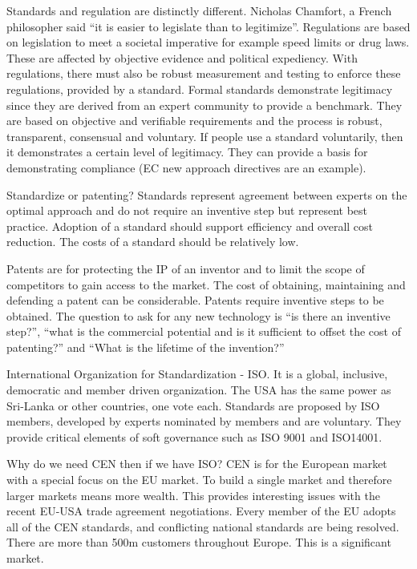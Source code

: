 Standards and regulation are distinctly different. Nicholas Chamfort, a French philosopher said ``it is easier to legislate than to legitimize''. 
Regulations are based on legislation to meet a societal imperative for example speed limits or drug laws. 
These are affected by objective evidence and political expediency. 
With regulations, there must also be robust measurement and testing to enforce these regulations, provided by a standard. 
Formal standards demonstrate legitimacy since they are derived from an expert community to provide a benchmark. 
They are based on objective and verifiable requirements and the process is robust, transparent, consensual and voluntary. 
If people use a standard voluntarily, then it demonstrates a certain level of legitimacy. 
They can provide a basis for demonstrating compliance (EC new approach directives are an example).

Standardize or patenting? 
Standards represent agreement between experts on the optimal approach and do not require an inventive step but represent best practice. 
Adoption of a standard should support efficiency and overall cost reduction. 
The costs of a standard should be relatively low. 

Patents are for protecting the IP of an inventor and to limit the scope of competitors to gain access to the market. 
The cost of obtaining, maintaining and defending a patent can be considerable. 
Patents require inventive steps to be obtained. 
The question to ask for any new technology is ``is there an inventive step?'', ``what is the commercial potential and is it sufficient to offset the cost of patenting?'' and ``What is the lifetime of the invention?''

International Organization for Standardization - ISO. It is a global, inclusive, democratic and member driven organization. The USA has the same power as Sri-Lanka or other countries, one vote each. Standards are proposed by ISO members, developed by experts nominated by members and are voluntary. They provide critical elements of soft governance such as ISO 9001 and ISO14001. 

Why do we need CEN then if we have ISO? 
CEN is for the European market with a special focus on the EU market. 
To build a single market and therefore larger markets means more wealth. 
This provides interesting issues with the recent EU-USA trade agreement negotiations.
 Every member of the EU adopts all of the CEN standards, and conflicting national standards are being resolved. 
There are more than 500m customers throughout Europe. 
This is a significant market. 

